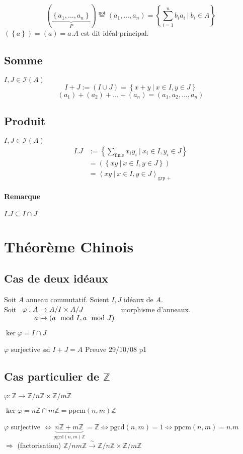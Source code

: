 \documentclass[reqno,a4paper,10pt]{report}
\makeatletter
\newcommand{\gen}[1]{\left\langle #1 \right\rangle} %
\newcommand{\set}[1]{\left\lbrace #1 \right\rbrace} %
\newcommand{\underb}[2]{\underset{#1}{\underbrace{#2}}}
\newcommand{\IZ}{\ensuremath{\mathbb{Z}}\xspace} %
\newcommand{\soo}{\Longrightarrow}
\newcommand{\bij}{\overset{\!\sim}{\to}} %
\newcommand{\pgcd}{\mathrm{pgcd}} %
\newcommand{\ppcm}{\mathrm{ppcm}}
\newcommand{\Such}{\ \Big| \ }
\newcommand{\such}{\ | \ }
\newcommand{\tnot}[1]{\overset{\text{not}}{ #1 }}
\let\oldenumerate=\enumerate%
\renewenvironment{enumerate}{%
    \oldenumerate%
  }{%
    \@noparlisttrue%
    \endlist%
  }%
\makeatother
\begin{document}
\[(\underb{P}{\set{a_1, \dots, a_n}})\tnot{=}(a_1, \dots, a_n) =
\set{\sum_{i=1}^n b_i a_i \Such b_i \in A}\]
$(\set{a}) = (a) = a. A$ est dit idéal principal.

\subsection{Somme}
$I, J \in \mathcal I (A)$
\[I+J:=(I\cup J)=\set{x+y \Such x \in I, y \in J}\]
\[(a_1)+(a_2)+\dots+(a_n) = (a_1, a_2, \dots, a_n)\]

\subsection{Produit}
$I,J \in \mathcal{I}(A)$
\begin{align*}
  I.J&:=\set{\sum_{\text{finie}}x_i y_i \Such x_i \in I, y_i \in J}\\
  &=\left( \set{xy \such x\in I, y\in J} \right)\\
  &=\gen{xy \such x\in I, y\in J}_{\text{grp }+}
\end{align*}

\paragraph{Remarque} $I.J \subseteq I\cap J$

\section{Théorème Chinois}
\subsection{Cas de deux idéaux}
Soit $A$ anneau commutatif. Soient $I, J$ idéaux de $A$.\\
Soit $\begin{array}[t]{r@{\ }l}
  \varphi : A &\to A/I \times A/J\\
  a &\mapsto (a \mod I, a \mod J)
\end{array}$ morphisme d'anneaux.
\begin{enumerate}[(i)]
  \item $\ker \varphi = I \cap J$
  \item $\varphi$ surjective ssi $I+J=A$
\end{enumerate}
  Preuve 29/10/08 p1

\subsection{Cas particulier de $\IZ$}
$\varphi: \IZ \to \IZ/n\IZ \times \IZ/m\IZ$
\begin{enumerate}[1)]
  \item $\ker \varphi = n\IZ \cap m\IZ = \ppcm(n,m)\IZ$
  \item $\varphi$ surjective $\iff\underb{\pgcd(n,m)\IZ}{n\IZ+m\IZ}=\IZ \iff
    \pgcd(n,m)=1 \iff \ppcm(n,m)=n.m$\\
    $\soo$ (factorisation) $\IZ/nm\IZ \bij \IZ/n\IZ \times \IZ/m\IZ$
\end{enumerate}
\end{document}
